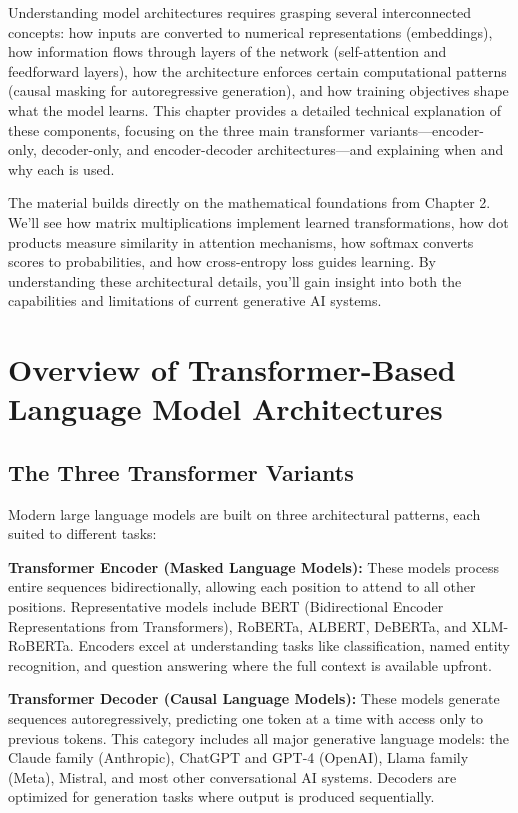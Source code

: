 \documentclass{book}
\begin{document}
Understanding model architectures requires grasping several interconnected concepts: how inputs are converted to numerical representations (embeddings), how information flows through layers of the network (self-attention and feedforward layers), how the architecture enforces certain computational patterns (causal masking for autoregressive generation), and how training objectives shape what the model learns. This chapter provides a detailed technical explanation of these components, focusing on the three main transformer variants—encoder-only, decoder-only, and encoder-decoder architectures—and explaining when and why each is used.

The material builds directly on the mathematical foundations from Chapter 2. We'll see how matrix multiplications implement learned transformations, how dot products measure similarity in attention mechanisms, how softmax converts scores to probabilities, and how cross-entropy loss guides learning. By understanding these architectural details, you'll gain insight into both the capabilities and limitations of current generative AI systems.

\section{Overview of Transformer-Based Language Model Architectures}

\subsection{The Three Transformer Variants}

Modern large language models are built on three architectural patterns, each suited to different tasks:

\textbf{Transformer Encoder (Masked Language Models):} These models process entire sequences bidirectionally, allowing each position to attend to all other positions. Representative models include BERT (Bidirectional Encoder Representations from Transformers), RoBERTa, ALBERT, DeBERTa, and XLM-RoBERTa. Encoders excel at understanding tasks like classification, named entity recognition, and question answering where the full context is available upfront.

\textbf{Transformer Decoder (Causal Language Models):} These models generate sequences autoregressively, predicting one token at a time with access only to previous tokens. This category includes all major generative language models: the Claude family (Anthropic), ChatGPT and GPT-4 (OpenAI), Llama family (Meta), Mistral, and most other conversational AI systems. Decoders are optimized for generation tasks where output is produced sequentially.
\end{document}
